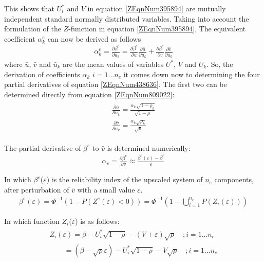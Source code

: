 {This shows that $U_i^{*}$ and $V$ in equation \eqref{ZEqnNum395894} are mutually independent standard normally distributed variables.
Taking into account the formulation of the $Z$-function in equation \eqref{ZEqnNum395894}, The equivalent coefficient $\alpha_k^e$ can now be derived as follows
\begin{align}
\alpha _{k}^{e} =\frac{\partial \beta ^{e} }{\partial \bar{u}_{k} } =\frac{\partial \beta ^{e} }{\partial \bar{u}} \frac{\partial \bar{u}}{\partial \bar{u}_{k} } +\frac{\partial \beta ^{e} }{\partial \bar{v}} \frac{\partial \bar{v}}{\partial \bar{u}_{k} } \label{ZEqnNum438636} 
\end{align}
where $\bar{u}$, $\bar{v}$ and $\bar{u}_k$ are the mean values of variables $U^{*}$, $V$ and $U_k$.
So, the derivation of coefficients $\alpha_k$ $i=1...n_e$ it comes down now to determining the four partial derivatives of equation \eqref{ZEqnNum438636}.
The first two can be determined directly from equation \eqref{ZEqnNum809022}:
\begin{align}
\begin{array}{l} {\frac{\partial \bar{u}}{\partial \bar{u}_{k} } =\frac{\alpha _{k} \sqrt{1-\rho _{k} } }{\sqrt{1-\rho } } } \\ {\frac{\partial \bar{v}}{\partial \bar{u}_{k} } =\frac{\alpha _{k} \sqrt{\rho _{k} } }{\sqrt{\rho } } } \end{array}\label{ZEqnNum945170} 
\end{align}

The partial derivative of $\beta^e$ to $\bar{v}$ is determined numerically:
\begin{align}
\alpha _{v} =\frac{\partial \beta ^{e} }{\partial \bar{v}} \approx \frac{\beta ^{e} \left(\varepsilon \right)-\beta ^{e} }{\varepsilon } \label{ZEqnNum432286} 
\end{align}

In which $\beta^e$($\varepsilon$) is the reliability index of the upscaled system of $n_e$ components, after perturbation of $\bar{v}$ with a small value $\varepsilon$. 
\begin{align}
\beta ^{e} \left(\varepsilon \right)=\Phi ^{-1} \left(1-P\left(Z^{e} \left(\varepsilon \right)<0\right)\right)=\Phi ^{-1} \left(1-\bigcup _{i=1}^{n_{e} }P\left(Z_{i} \left(\varepsilon \right)\right) \right)\label{ZEqnNum242869} 
\end{align}

In which function $Z_i$($\varepsilon$) is as follows: 
\begin{align}
\begin{array}{l} {Z_{i} \left(\varepsilon \right)=\beta -U_{i}^{*} \sqrt{1-\rho } -\left(V+\varepsilon \right)\sqrt{\rho } \quad ;i=1...n_{e} } \\ {\quad \quad    =\left(\beta -\sqrt{\rho } \varepsilon \right)-U_{i}^{*} \sqrt{1-\rho } -V\sqrt{\rho } \quad ;i=1...n_{e} } \end{array}\label{ZEqnNum791362} 
\end{align}

}
